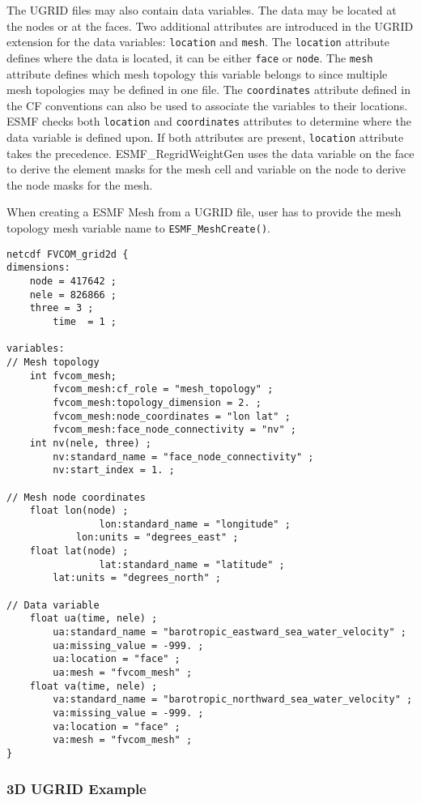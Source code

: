The UGRID files may also contain data variables.  The data may be located at the nodes or at the faces.  Two additional attributes are introduced in the UGRID extension for the data variables:  {\tt location} and {\tt mesh}.  The {\tt location}
attribute defines where the data is located, it can be either {\tt face} or {\tt node}.  The {\tt mesh} attribute defines which mesh topology this variable belongs to since multiple mesh topologies may be defined in one
file.  The {\tt coordinates} attribute defined in the CF conventions can also be used to associate the variables to their locations.  ESMF checks both {\tt location} and {\tt coordinates} attributes to determine where the data variable is defined upon. If both attributes are present, {\tt location} attribute takes the precedence.  ESMF\_RegridWeightGen uses the data variable on the face to derive the element masks for the mesh cell and variable on the node to derive the node masks for the mesh. 

When creating a ESMF Mesh from a UGRID file, user has to provide the mesh topology mesh variable name to {\tt ESMF\_MeshCreate()}.

\begin{verbatim}
netcdf FVCOM_grid2d {
dimensions:
	node = 417642 ;
	nele = 826866 ;
	three = 3 ;
        time  = 1 ;

variables:
// Mesh topology
	int fvcom_mesh;
		fvcom_mesh:cf_role = "mesh_topology" ;
		fvcom_mesh:topology_dimension = 2. ;
		fvcom_mesh:node_coordinates = "lon lat" ;
		fvcom_mesh:face_node_connectivity = "nv" ;
	int nv(nele, three) ;
		nv:standard_name = "face_node_connectivity" ;
		nv:start_index = 1. ;

// Mesh node coordinates
	float lon(node) ;
                lon:standard_name = "longitude" ;
	        lon:units = "degrees_east" ;
	float lat(node) ;
                lat:standard_name = "latitude" ;
		lat:units = "degrees_north" ;

// Data variable
	float ua(time, nele) ;
		ua:standard_name = "barotropic_eastward_sea_water_velocity" ;
		ua:missing_value = -999. ;
		ua:location = "face" ;
		ua:mesh = "fvcom_mesh" ;
	float va(time, nele) ;
		va:standard_name = "barotropic_northward_sea_water_velocity" ;
		va:missing_value = -999. ;
		va:location = "face" ;
		va:mesh = "fvcom_mesh" ;
}
\end{verbatim}

\subsubsection{3D UGRID Example}

